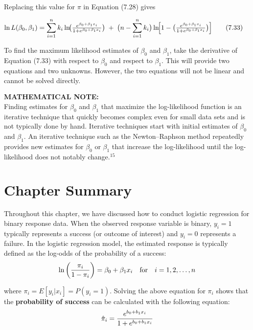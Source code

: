 \documentclass[
]{report}
\begin{document}
Replacing this value for \(\pi\) in Equation (7.28) gives

\begin{align}
\ln L(\beta_0, \beta_1)
&= \sum_{i=1}^n k_i \ln\!\bigl(\tfrac{e^{\beta_0 + \beta_1 x_i}}{1 + e^{\beta_0 + \beta_1 x_i}}\bigr)
\;+\;\bigl(n - \sum_{i=1}^n k_i\bigr)\ln\!\Bigl[1 - \bigl(\tfrac{e^{\beta_0 + \beta_1 x_i}}{1 + e^{\beta_0 + \beta_1 x_i}}\bigr)\Bigr]
\tag{7.33}
\end{align}

To find the maximum likelihood estimates of \(\beta_0\) and \(\beta_1\), take the derivative of Equation (7.33) with respect to \(\beta_0\) and respect to \(\beta_1\). This will provide two equations and two unknowns. However, the two equations will not be linear and cannot be solved directly.

\large

\textbf{MATHEMATICAL NOTE:}\\
Finding estimates for \(\beta_0\) and \(\beta_1\) that maximize the log-likelihood function is an iterative technique that quickly becomes complex even for small data sets and is not typically done by hand. Iterative techniques start with initial estimates of \(\beta_0\) and \(\beta_1\). An iterative technique such as the Newton--Raphson method repeatedly provides new estimates for \(\beta_0\) or \(\beta_1\) that increase the log-likelihood until the log-likelihood does not notably change.\(^{15}\)\\
\normalsize

\section*{\texorpdfstring{\textbf{Chapter Summary}}{Chapter Summary}}\label{chapter-summary-5}

Throughout this chapter, we have discussed how to conduct logistic regression for binary response data. When the observed response variable is binary, \(y_i = 1\) typically represents a success (or outcome of interest) and \(y_i = 0\) represents a failure. In the logistic regression model, the estimated response is typically defined as the log-odds of the probability of a success:
\begin{align}
\ln\left(\frac{\pi_i}{1-\pi_i}\right) = \beta_0 + \beta_1 x_i \quad \text{for} \quad i = 1, 2, \ldots, n
\notag
\end{align}

where \(\pi_i = E[y_i | x_i] = P(y_i = 1)\). Solving the above equation for \(\pi_i\) shows that the \textbf{probability of success} can be calculated with the following equation:
\begin{align}
\hat{\pi}_i = \frac{e^{b_0 + b_1 x_i}}{1 + e^{b_0 + b_1 x_i}}
\notag
\end{align}
\end{document}
